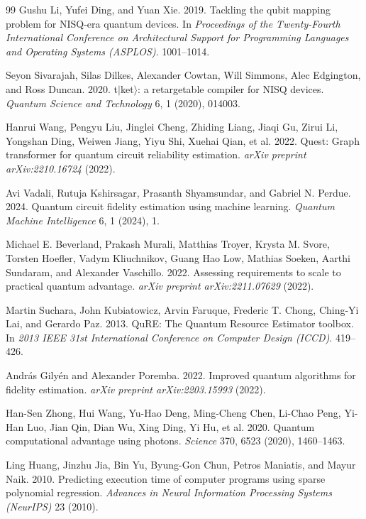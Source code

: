 \documentclass[11pt, a4paper]{article}
\begin{document}
\begin{thebibliography}{99}
Gushu Li, Yufei Ding, and Yuan Xie. 2019. Tackling the qubit mapping problem for NISQ-era quantum devices. In \textit{Proceedings of the Twenty-Fourth International Conference on Architectural Support for Programming Languages and Operating Systems (ASPLOS)}. 1001--1014.

Seyon Sivarajah, Silas Dilkes, Alexander Cowtan, Will Simmons, Alec Edgington, and Ross Duncan. 2020. t$|$ket$\rangle$: a retargetable compiler for NISQ devices. \textit{Quantum Science and Technology} 6, 1 (2020), 014003.

Hanrui Wang, Pengyu Liu, Jinglei Cheng, Zhiding Liang, Jiaqi Gu, Zirui Li, Yongshan Ding, Weiwen Jiang, Yiyu Shi, Xuehai Qian, et al. 2022. Quest: Graph transformer for quantum circuit reliability estimation. \textit{arXiv preprint arXiv:2210.16724} (2022).

Avi Vadali, Rutuja Kshirsagar, Prasanth Shyamsundar, and Gabriel N. Perdue. 2024. Quantum circuit fidelity estimation using machine learning. \textit{Quantum Machine Intelligence} 6, 1 (2024), 1.

Michael E. Beverland, Prakash Murali, Matthias Troyer, Krysta M. Svore, Torsten Hoefler, Vadym Kliuchnikov, Guang Hao Low, Mathias Soeken, Aarthi Sundaram, and Alexander Vaschillo. 2022. Assessing requirements to scale to practical quantum advantage. \textit{arXiv preprint arXiv:2211.07629} (2022).

Martin Suchara, John Kubiatowicz, Arvin Faruque, Frederic T. Chong, Ching-Yi Lai, and Gerardo Paz. 2013. QuRE: The Quantum Resource Estimator toolbox. In \textit{2013 IEEE 31st International Conference on Computer Design (ICCD)}. 419--426.

Andr{\'a}s Gily{\'e}n and Alexander Poremba. 2022. Improved quantum algorithms for fidelity estimation. \textit{arXiv preprint arXiv:2203.15993} (2022).

Han-Sen Zhong, Hui Wang, Yu-Hao Deng, Ming-Cheng Chen, Li-Chao Peng, Yi-Han Luo, Jian Qin, Dian Wu, Xing Ding, Yi Hu, et al. 2020. Quantum computational advantage using photons. \textit{Science} 370, 6523 (2020), 1460--1463.

Ling Huang, Jinzhu Jia, Bin Yu, Byung-Gon Chun, Petros Maniatis, and Mayur Naik. 2010. Predicting execution time of computer programs using sparse polynomial regression. \textit{Advances in Neural Information Processing Systems (NeurIPS)} 23 (2010).


\end{thebibliography}
\end{document}
